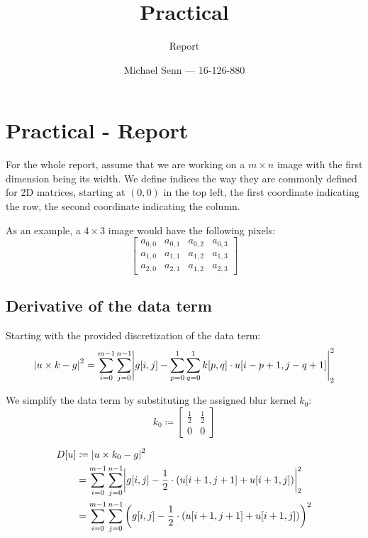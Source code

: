\documentclass[a4paper]{scrreprt}
\title{Practical \series}
\subtitle{Report}
\author{Michael Senn \maillink{michael.senn@students.unibe.ch} --- 16-126-880}
\date{\printdate}
\DeclarePairedDelimiter\abs{\lvert}{\rvert}
\newcommand{\series}{01}
\begin{document}
\maketitle


\setcounter{chapter}{\numexpr \series - 1 \relax}

\chapter{Practical - Report}

For the whole report, assume that we are working on a $m \times n$ image with
the first dimension being its width. We define indices the way they are
commonly defined for 2D matrices, starting at $(0, 0)$ in the top left, the
first coordinate indicating the row, the second coordinate indicating the
column.

As an example, a $4 \times 3$ image would have the following pixels:
\[
		\begin{bmatrix}
				a_{0, 0} & a_{0, 1} & a_{0, 2} & a_{0, 3} \\
				a_{1, 0} & a_{1, 1} & a_{1, 2} & a_{1, 3} \\
				a_{2, 0} & a_{2, 1} & a_{1, 2} & a_{2, 3}
		\end{bmatrix}
\]

\section{Derivative of the data term}
\label{sec:derivative_of_data_term}

Starting with the provided discretization of the data term:
\[
		\abs*{u \times k - g}^2 = \sum_{i=0}^{m-1} \sum_{j=0}^{n-1} \abs*{g[i, j] - \sum_{p=0}^{1} \sum_{q=0}^{1} k[p, q] \cdot u[i - p + 1, j - q + 1]}_2^2
\]

We simplify the data term by substituting the assigned blur kernel $k_0$:
\[
		k_0 \coloneqq \begin{bmatrix}
				\frac{1}{2} & \frac{1}{2} \\
				0 & 0
		\end{bmatrix}
\]

\begin{align*}
		D[u] & \coloneqq \abs*{u \times k_0 - g}^2 \\ 
			 & = \sum_{i=0}^{m-1} \sum_{j=0}^{n-1} \abs*{g[i, j] - \frac{1}{2} \cdot (u[i + 1, j + 1] + u[i + 1, j])}_2^2 \\
			 & = \sum_{i=0}^{m-1} \sum_{j=0}^{n-1} \left(g[i, j] - \frac{1}{2} \cdot (u[i + 1, j + 1] + u[i + 1, j])\right)^2
\end{align*}
\end{document}
